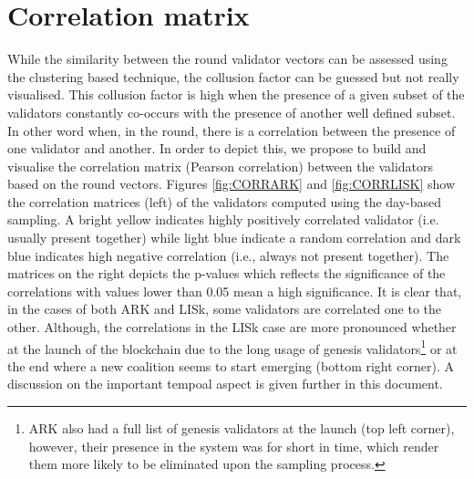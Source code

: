 \documentclass{article}
\begin{document}
\section{Correlation matrix}
\label{sec:cm}
While the similarity between the round validator vectors can be assessed using the clustering based technique, the collusion factor can be guessed but not really visualised. This collusion factor is high when the presence of a given subset of the validators constantly co-occurs with the presence of another well defined subset. In other word when, in the round, there is a correlation between the presence of one validator and another. In order to depict this, we propose to build and visualise the correlation matrix (Pearson correlation) between the validators based on the round vectors. Figures \ref{fig:CORRARK} and \ref{fig:CORRLISK} show the correlation matrices (left) of the validators computed using the day-based sampling. A bright yellow indicates highly positively correlated validator (i.e. usually present together) while light blue indicate a random correlation and dark blue indicates high negative correlation (i.e., always not present together). The matrices on the right depicts the p-values which reflects the significance of the correlations with values lower than 0.05 mean a high significance.
It is clear that, in the cases of both ARK and LISk, some validators are correlated one to the other. Although, the correlations in the LISk case are more pronounced whether at the launch of the blockchain due to the long usage of genesis validators\footnote{ARK also had a full list of genesis validators at the launch (top left corner), however, their presence in the system was for short in time, which render them more likely to be eliminated upon the sampling process.} or at the end where a new coalition seems to start emerging (bottom right corner).  A discussion on the important tempoal aspect is given further in this document.
\end{document}
